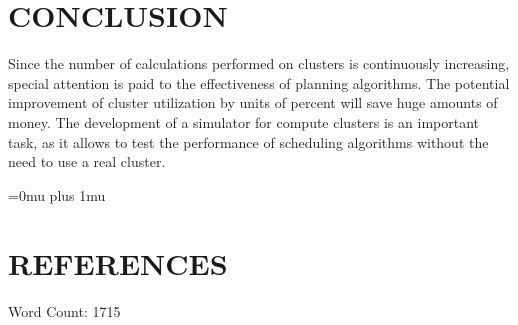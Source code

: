 \documentclass[a4paper,10pt]{article}
\begin{document}
\begin{multicols*}{2}
\section{{\normalsize C}ONCLUSION}

Since the number of calculations performed on clusters is continuously increasing, special attention is paid to the effectiveness of planning algorithms. The potential improvement of cluster utilization by units of percent will save huge amounts of money. The development of a simulator for compute clusters is an important task, as it allows to test the performance of scheduling algorithms without the need to use a real cluster. 

\Urlmuskip=0mu plus 1mu\relax

\section*{{\normalsize R}EFERENCES}
\printbibliography

\begin{flushright}
    Word Count: 1715
\end{flushright}

\end{multicols*}
\end{document}
